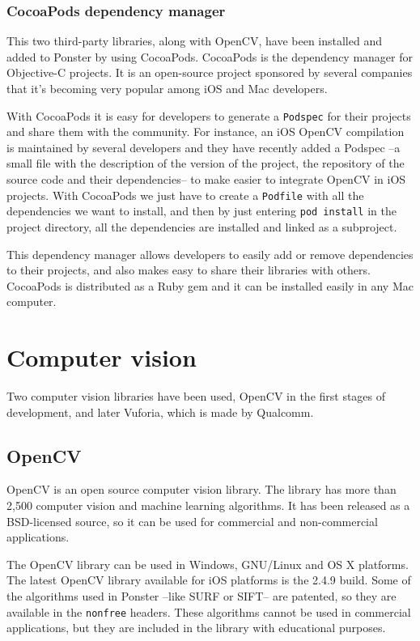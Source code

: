 \subsubsection{CocoaPods dependency manager}
This two third-party libraries, along with OpenCV, have been installed and added to
Ponster by using CocoaPods. CocoaPods is the dependency manager for Objective-C
projects\cite{cocoapods}. It is an open-source project sponsored by several
companies that it's becoming very popular among iOS and Mac developers.

With CocoaPods it is easy for developers to generate a \texttt{Podspec} for their
projects and share them with the community. For instance, an iOS OpenCV compilation
is maintained by several developers and they have recently added a Podspec --a small
file with the description of the version of the project, the repository of the
source code and their dependencies-- to make easier to integrate OpenCV in iOS
projects. With CocoaPods we just have to create a \texttt{Podfile} with all the
dependencies we want to install, and then by just entering \texttt{pod install} in
the project directory, all the dependencies are installed and linked as a
subproject.

This dependency manager allows developers to easily add or remove dependencies to
their projects, and also makes easy to share their libraries with others. CocoaPods
is distributed as a Ruby gem and it can be installed easily in any Mac computer.

\section{Computer vision}
Two computer vision libraries have been used, OpenCV in the first stages of
development, and later Vuforia, which is made by Qualcomm\textregistered. 

\subsection{OpenCV}
OpenCV is an open source computer vision library\cite{opencv}. The library has
more than 2,500 computer vision and machine learning algorithms. It has been
released as a BSD-licensed source, so it can be used for commercial and
non-commercial applications.

The OpenCV library can be used in Windows, GNU/Linux and OS X platforms. The
latest OpenCV library available for iOS platforms is the 2.4.9
build\cite{opencvpod}. Some of the algorithms used in Ponster --like SURF or SIFT--
are patented, so they are available in the \texttt{nonfree} headers. These
algorithms cannot be used in commercial applications, but they are included in
the library with educational purposes. 

